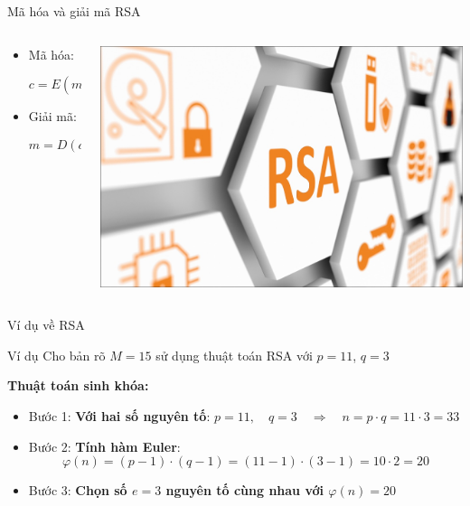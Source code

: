 \documentclass{beamer}
\numberwithin{equation}{section}
\begin{document}
\begin{frame}{Mã hóa và giải mã RSA}

\begin{columns}

\begin{column}{0.6\textwidth}

\begin{itemize}

\item Mã hóa:

\[
c = E (m, K_B^+) = m^e \mod n
\]

\item Giải mã:

\[
m = D (c, K_B^-) = c^d \mod n
\]

\end{itemize}

\end{column}

\begin{column}{0.4\textwidth}
\includegraphics[width=\textwidth]{pictures/chu-ky-so-rsa-1.jpg}
\end{column}

\end{columns}

\end{frame}
\begin{frame}{Ví dụ về RSA}

\begin{block}{Ví dụ}
Cho bản rõ \(M = 15 \) sử dụng thuật toán RSA với \(p = 11 \), \(q = 3 \)
\end{block}

\textbf{Thuật toán sinh khóa:}

\begin{itemize}
\item Bước 1: \textbf{Với hai số nguyên tố}:
$p = 11, \quad q = 3 \quad \Rightarrow \quad n = p \cdot q = 11 \cdot 3 = 33$
\item Bước 2: \textbf{Tính hàm Euler}:
\[
\varphi(n) = (p - 1) \cdot (q - 1) = (11 - 1) \cdot (3 - 1) = 10 \cdot 2 = 20
\]
\item Bước 3: \textbf{Chọn số $e = 3$ nguyên tố cùng nhau với $\varphi(n) = 20$}
\end{itemize}

\end{frame}
\end{document}
